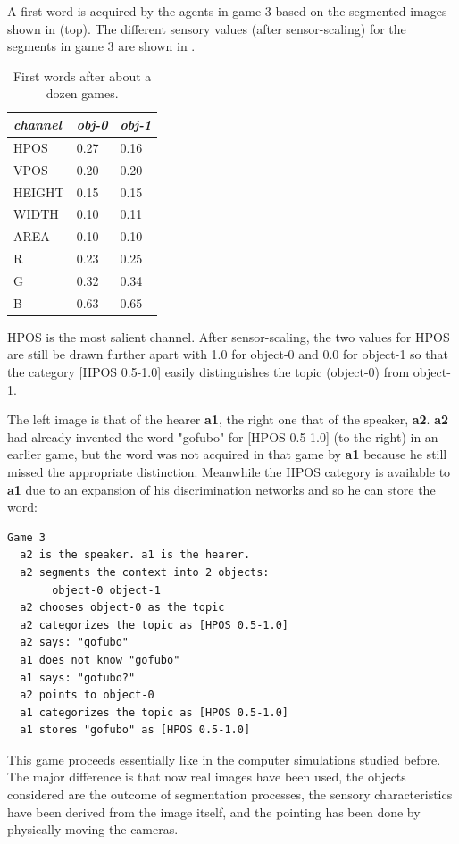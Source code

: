 A first word is acquired by the agents in game 3 
based on the segmented images shown in  (top).
The different sensory values (after sensor-scaling)
for the segments in game 3 are shown in . 
\begin{table}
\begin{center}
\begin{tabular}{| l | l | l |} \hline
{\it channel}& {\it obj-0} & {\it obj-1}\\ \hline
HPOS & 0.27 & 0.16\\ \hline
VPOS & 0.20 & 0.20\\ \hline
HEIGHT & 0.15 & 0.15\\ \hline
WIDTH & 0.10 & 0.11\\ \hline
AREA & 0.10 & 0.10\\ \hline
R & 0.23 & 0.25\\ \hline
G & 0.32 & 0.34\\ \hline
B & 0.63 & 0.65\\ \hline
\end{tabular}
\caption{ \label{tab:game3b} First words after about a dozen games.}
\end{center}
\end{table}
HPOS is the most salient channel. After sensor-scaling, 
the two values for HPOS are still be drawn further
apart with 1.0 for object-0 and 
0.0 for object-1 so that the category [HPOS 0.5-1.0] easily 
distinguishes the topic (object-0) from object-1.

The left image is that of the hearer {\bf a1}, the right one
that of the speaker, {\bf a2}.
{\bf a2} had already invented the word "gofubo" for 
[HPOS 0.5-1.0] (to the right) in an earlier game, 
but the word was not acquired in that game
by {\bf a1} because he still missed the 
appropriate distinction. Meanwhile the HPOS category 
is available to {\bf a1} due to an
expansion of his discrimination networks
and so he can store the word: 
\begin{verbatim}
Game 3 
  a2 is the speaker. a1 is the hearer. 
  a2 segments the context into 2 objects: 
       object-0 object-1
  a2 chooses object-0 as the topic 
  a2 categorizes the topic as [HPOS 0.5-1.0]
  a2 says: "gofubo"
  a1 does not know "gofubo"
  a1 says: "gofubo?"
  a2 points to object-0
  a1 categorizes the topic as [HPOS 0.5-1.0]
  a1 stores "gofubo" as [HPOS 0.5-1.0]
\end{verbatim}
This game proceeds essentially like in the computer
simulations studied before. The major difference is
that now real images have been used, the objects
considered are the outcome of segmentation processes,
the sensory characteristics have been derived from the 
image itself, and the pointing has been done by 
physically moving the cameras. 

